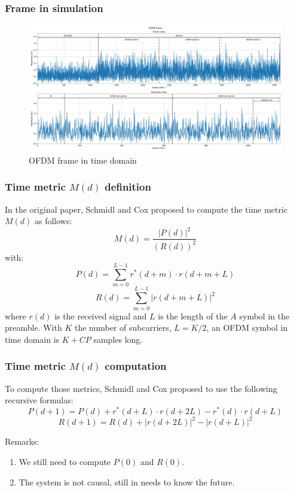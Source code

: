 \documentclass[10pt]{beamer}
\begin{document}
\begin{frame}
    \frametitle{Frame in simulation}
    \begin{figure}
        \centering
        \includegraphics[width=\textwidth]{schmidl_cox_plots/OFDM_frame.pdf}
        \caption{OFDM frame in time domain}
    \end{figure}    
\end{frame}

\begin{frame}
    \frametitle{Time metric $M(d)$ definition}
    In the original paper, Schmidl and Cox proposed to compute the time metric $M(d)$ as follows:
    \begin{equation}
        M(d) = \frac{|P(d)|^2}{(R(d))^2}
    \end{equation}
    with:
    \begin{equation}
        P(d) = \sum_{m=0}^{L-1} r^*(d+m) \cdot r(d+m+L)
    \end{equation}
    \begin{equation}
        R(d) = \sum_{m=0}^{L-1} |r(d+m+L)|^2
    \end{equation}
    where $r(d)$ is the received signal and $L$ is the length of the $A$ symbol in the preamble. With $K$ the number of subcarriers, $L = K/2$, an OFDM symbol in time domain is $K + CP$ samples long.
\end{frame}

\begin{frame}
    \frametitle{Time metric $M(d)$ computation}
    To compute those metrics, Schmidl and Cox proposed to use the following recursive formulas:
    \begin{equation}
        P(d+1) = P(d) + r^*(d+L) \cdot r(d+2L) - r^*(d) \cdot r(d+L)
    \end{equation}
    \begin{equation}
        R(d+1) = R(d) + |r(d+2L)|^2 - |r(d+L)|^2
    \end{equation}

    Remarks:
    \begin{enumerate}
        \item We still need to compute $P(0)$ and $R(0)$.
        \item The system is not causal, still in needs to know the future.
    \end{enumerate}    
\end{frame}
\end{document}
